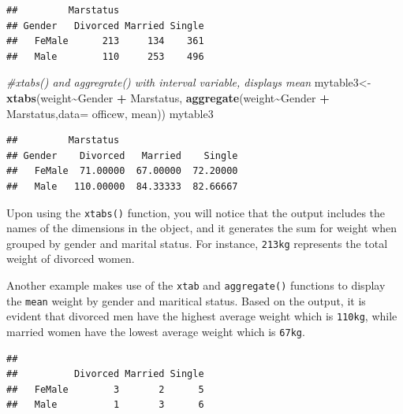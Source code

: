 \documentclass[
]{article}
\newenvironment{Shaded}{\begin{snugshade}}{\end{snugshade}}
\newcommand{\AttributeTok}[1]{\textcolor[rgb]{0.13,0.29,0.53}{#1}}
\newcommand{\CommentTok}[1]{\textcolor[rgb]{0.56,0.35,0.01}{\textit{#1}}}
\newcommand{\FunctionTok}[1]{\textcolor[rgb]{0.13,0.29,0.53}{\textbf{#1}}}
\newcommand{\NormalTok}[1]{#1}
\newcommand{\OtherTok}[1]{\textcolor[rgb]{0.56,0.35,0.01}{#1}}
\newcommand{\SpecialCharTok}[1]{\textcolor[rgb]{0.81,0.36,0.00}{\textbf{#1}}}
\begin{document}
\begin{verbatim}
##         Marstatus
## Gender   Divorced Married Single
##   FeMale      213     134    361
##   Male        110     253    496
\end{verbatim}

\begin{Shaded}
\begin{Highlighting}[]
\CommentTok{\#xtabs() and aggregrate() with interval variable, displays mean}
\NormalTok{mytable3}\OtherTok{\textless{}{-}} \FunctionTok{xtabs}\NormalTok{(weight}\SpecialCharTok{\textasciitilde{}}\NormalTok{Gender }\SpecialCharTok{+}\NormalTok{ Marstatus, }\FunctionTok{aggregate}\NormalTok{(weight}\SpecialCharTok{\textasciitilde{}}\NormalTok{Gender }\SpecialCharTok{+}\NormalTok{ Marstatus,}\AttributeTok{data=}\NormalTok{ officew, mean))}
\NormalTok{mytable3}
\end{Highlighting}
\end{Shaded}

\begin{verbatim}
##         Marstatus
## Gender    Divorced   Married    Single
##   FeMale  71.00000  67.00000  72.20000
##   Male   110.00000  84.33333  82.66667
\end{verbatim}

Upon using the \texttt{xtabs()} function, you will notice that the
output includes the names of the dimensions in the object, and it
generates the sum for weight when grouped by gender and marital status.
For instance, \texttt{213kg} represents the total weight of divorced
women.

Another example makes use of the \texttt{xtab} and \texttt{aggregate()}
functions to display the \texttt{mean} weight by gender and maritical
status. Based on the output, it is evident that divorced men have the
highest average weight which is \texttt{110kg}, while married women have
the lowest average weight which is \texttt{67kg}.

\begin{Shaded}
\end{Shaded}

\begin{verbatim}
##         
##          Divorced Married Single
##   FeMale        3       2      5
##   Male          1       3      6
\end{verbatim}
\end{document}
